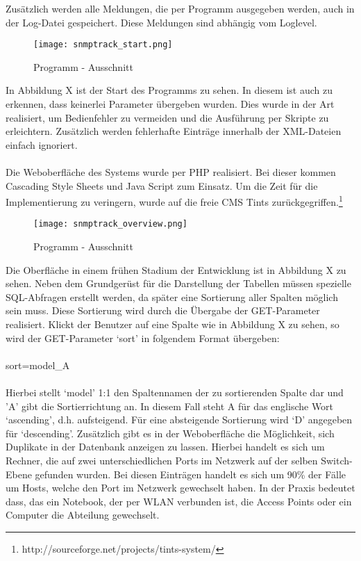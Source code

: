 Zusätzlich werden alle Meldungen, die per Programm ausgegeben werden, auch in der Log-Datei gespeichert.
Diese Meldungen sind abhängig vom Loglevel.
\\
\begin{figure}[H]
\centering
\texttt{[image: snmptrack\_start.png]}
\caption{Programm - Ausschnitt}
\label{fig:show_s1_s2_p1_n1}
\end{figure}
In Abbildung X ist der Start des Programms zu sehen. In diesem ist auch zu erkennen, dass keinerlei Parameter übergeben wurden. Dies wurde in der Art realisiert, um Bedienfehler zu vermeiden und die Ausführung per Skripte zu erleichtern.
Zusätzlich werden fehlerhafte Einträge innerhalb der XML-Dateien einfach ignoriert.\\\\
Die Weboberfläche des Systems wurde per PHP realisiert.
Bei dieser kommen Cascading Style Sheets und Java Script zum Einsatz.
Um die Zeit für die Implementierung zu veringern, wurde auf die freie CMS Tints zurückgegriffen.\footnote{http://sourceforge.net/projects/tints-system/}
\\
\begin{figure}[H]
\centering
\texttt{[image: snmptrack\_overview.png]}
\caption{Programm - Ausschnitt}
\label{fig:show_s1_s2_p1_n1}
\end{figure}
Die Oberfläche in einem frühen Stadium der Entwicklung ist in Abbildung X zu sehen.
Neben dem Grundgerüst für die Darstellung der Tabellen müssen spezielle SQL-Abfragen erstellt werden, da später eine Sortierung aller Spalten möglich sein muss.
Diese Sortierung wird durch die Übergabe der GET-Parameter realisiert. Klickt der Benutzer auf eine Spalte wie in Abbildung X zu sehen, so wird der GET-Parameter ‘sort’ in folgendem Format übergeben:\\
\\
sort=model\_A\\
\\
Hierbei stellt ‘model’ 1:1 den Spaltennamen der zu sortierenden Spalte dar und 'A' gibt die Sortierrichtung an. In diesem Fall steht A für das englische Wort ‘ascending’, d.h. aufsteigend. Für eine absteigende Sortierung wird ‘D’ angegeben für ‘descending’.
Zusätzlich gibt es in der Weboberfläche die Möglichkeit, sich Duplikate in der Datenbank anzeigen zu lassen.
Hierbei handelt es sich um Rechner, die auf zwei unterschiedlichen Ports im Netzwerk auf der selben Switch-Ebene gefunden wurden.
Bei diesen Einträgen handelt es sich um 90\% der Fälle um Hosts, welche den Port im Netzwerk gewechselt haben.
In der Praxis bedeutet dass, das ein Notebook, der per WLAN verbunden ist, die Access Points oder ein Computer die Abteilung gewechselt.

